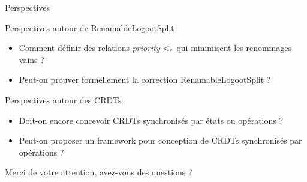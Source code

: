 \begin{frame}{Perspectives}
  \begin{block}{Perspectives autour de RenamableLogootSplit}
    \begin{itemize}
      \item Comment définir des relations \emph{priority} $<_{\varepsilon}$ qui minimisent les renommages vains ?
      \item Peut-on prouver formellement la correction RenamableLogootSplit ?
    \end{itemize}
  \end{block}
  \pause
  \begin{block}{Perspectives autour des CRDTs}
    \begin{itemize}
      \item Doit-on encore concevoir CRDTs synchronisés par états ou opérations ?
      \item Peut-on proposer un framework pour conception de CRDTs synchronisés par opérations ?
    \end{itemize}
  \end{block}
\end{frame}

\begin{frame}[standout]
  Merci de votre attention, avez-vous des questions ?
  \vspace{3em}
  \begin{center}
    \ccby
  \end{center}
\end{frame}

